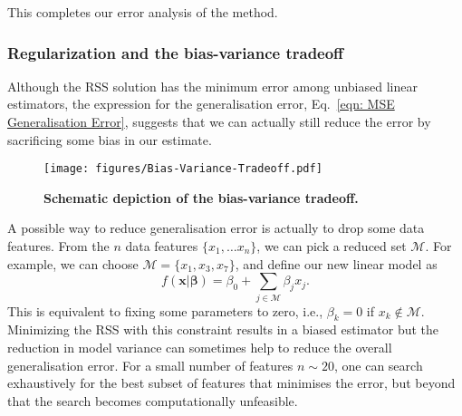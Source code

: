 This completes our error analysis of the method.


\subsubsection{Regularization and the bias-variance tradeoff}
Although the RSS solution has the minimum error among unbiased linear estimators, the expression for the generalisation error, Eq.~\eqref{eqn: MSE Generalisation Error}, suggests that we can actually still reduce the error by sacrificing some bias in our estimate. 
\begin{figure}[t]
\centering
    \texttt{[image: figures/Bias-Variance-Tradeoff.pdf]}
    \caption{\textbf{Schematic depiction of the bias-variance tradeoff.}
    }
\label{fig: Bias-Variance Tradeoff}
\end{figure}

A possible way to reduce generalisation error is actually to drop some data features. From the $n$ data features $\lbrace x_{1}, \dots x_{n} \rbrace$, we can pick a reduced set $\mathcal{M}$. For example, we can choose $\mathcal{M} = \lbrace x_{1}, x_{3}, x_{7} \rbrace$, and define our new linear model as
\begin{equation}\label{eqn: Univariate Subset Linear Model}
    f(\boldsymbol{x}|\bm{\beta}) = \beta_0 + \sum_{j \in \mathcal{M}} \beta_{j}x_{j}.
\end{equation}
This is equivalent to fixing some parameters to zero, i.e., $\beta_k = 0$ if $x_{k} \notin \mathcal{M}$. Minimizing the RSS with this constraint results in a biased estimator but the reduction in model variance can sometimes help to reduce the overall generalisation error. For a small number of features $n \sim 20$, one can search exhaustively for the best subset of features that minimises the error, but beyond that the search becomes computationally unfeasible.

